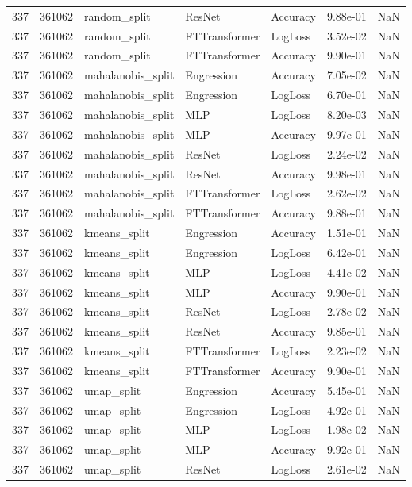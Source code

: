 \begin{tabular}{rrlllrr}
337 & 361062 & random\_split & ResNet & Accuracy & 9.88e-01 & NaN \\
337 & 361062 & random\_split & FTTransformer & LogLoss & 3.52e-02 & NaN \\
337 & 361062 & random\_split & FTTransformer & Accuracy & 9.90e-01 & NaN \\
337 & 361062 & mahalanobis\_split & Engression & Accuracy & 7.05e-02 & NaN \\
337 & 361062 & mahalanobis\_split & Engression & LogLoss & 6.70e-01 & NaN \\
337 & 361062 & mahalanobis\_split & MLP & LogLoss & 8.20e-03 & NaN \\
337 & 361062 & mahalanobis\_split & MLP & Accuracy & 9.97e-01 & NaN \\
337 & 361062 & mahalanobis\_split & ResNet & LogLoss & 2.24e-02 & NaN \\
337 & 361062 & mahalanobis\_split & ResNet & Accuracy & 9.98e-01 & NaN \\
337 & 361062 & mahalanobis\_split & FTTransformer & LogLoss & 2.62e-02 & NaN \\
337 & 361062 & mahalanobis\_split & FTTransformer & Accuracy & 9.88e-01 & NaN \\
337 & 361062 & kmeans\_split & Engression & Accuracy & 1.51e-01 & NaN \\
337 & 361062 & kmeans\_split & Engression & LogLoss & 6.42e-01 & NaN \\
337 & 361062 & kmeans\_split & MLP & LogLoss & 4.41e-02 & NaN \\
337 & 361062 & kmeans\_split & MLP & Accuracy & 9.90e-01 & NaN \\
337 & 361062 & kmeans\_split & ResNet & LogLoss & 2.78e-02 & NaN \\
337 & 361062 & kmeans\_split & ResNet & Accuracy & 9.85e-01 & NaN \\
337 & 361062 & kmeans\_split & FTTransformer & LogLoss & 2.23e-02 & NaN \\
337 & 361062 & kmeans\_split & FTTransformer & Accuracy & 9.90e-01 & NaN \\
337 & 361062 & umap\_split & Engression & Accuracy & 5.45e-01 & NaN \\
337 & 361062 & umap\_split & Engression & LogLoss & 4.92e-01 & NaN \\
337 & 361062 & umap\_split & MLP & LogLoss & 1.98e-02 & NaN \\
337 & 361062 & umap\_split & MLP & Accuracy & 9.92e-01 & NaN \\
337 & 361062 & umap\_split & ResNet & LogLoss & 2.61e-02 & NaN \\

\end{tabular}
